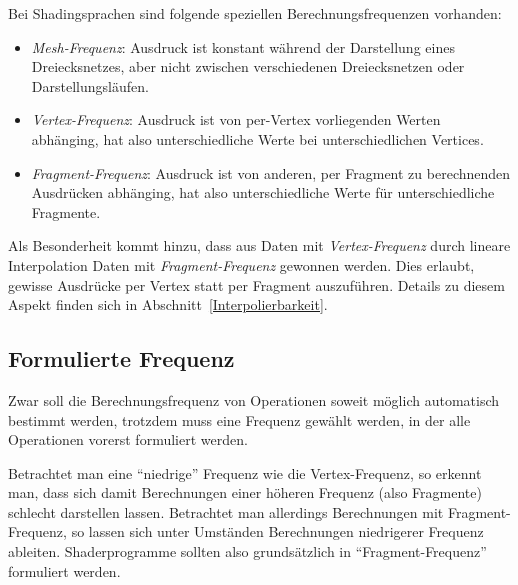 \documentclass[twoside,a4paper,fleqn,12pt]{book}
\begin{document}
Bei Shadingsprachen sind folgende speziellen Berechnungsfrequenzen vorhanden:
\begin{itemize}
\item \emph{Mesh-Frequenz}: Ausdruck ist konstant während der Darstellung eines Dreiecksnetzes, aber nicht zwischen
verschiedenen Dreiecksnetzen oder Darstellungsläufen. %
\item \emph{Vertex-Frequenz}: Ausdruck ist von per-Vertex vorliegenden Werten abhänging, hat also unterschiedliche Werte bei unterschiedlichen Vertices. %
\item \emph{Fragment-Frequenz}: Ausdruck ist von anderen, per Fragment zu berechnenden Ausdrücken abhänging,
hat also unterschiedliche Werte für unterschiedliche Fragmente. %
\end{itemize}

Als Besonderheit kommt hinzu, dass aus Daten mit \emph{Vertex-Frequenz} durch lineare Interpolation Daten mit
\emph{Fragment-Frequenz} gewonnen werden. %
Dies erlaubt, gewisse Ausdrücke per Vertex statt per Fragment auszuführen. Details zu diesem Aspekt finden sich in
Abschnitt~\ref{Interpolierbarkeit}.

\subsection{Formulierte Frequenz}
\label{formulierte_frequenz}

Zwar soll die Berechnungsfrequenz von Operationen soweit möglich automatisch bestimmt werden, trotzdem muss eine Frequenz
gewählt werden, in der alle Operationen vorerst formuliert werden.

Betrachtet man eine "`niedrige"' Frequenz wie die Vertex-Frequenz, so erkennt man, dass sich damit Berechnungen einer höheren
Frequenz (also Fragmente) schlecht darstellen lassen. Betrachtet man allerdings Berechnungen mit Fragment-Frequenz, so lassen sich
unter Umständen Berechnungen niedrigerer Frequenz ableiten.
Shaderprogramme sollten also grundsätzlich in "`Fragment-Frequenz"' formuliert werden.
\end{document}

